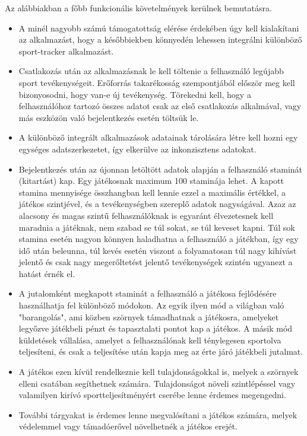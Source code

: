 Az alábbiakban a főbb funkcionális követelmények kerülnek bemutatásra. 

\begin{itemize}
	\item 
	A minél nagyobb számú támogatottság elérése érdekében úgy kell kialakítani az alkalmazást, hogy a későbbiekben könnyedén lehessen integrálni különböző sport-tracker alkalmazást. 
	\item 
	Csatlakozás után az alkalmazásnak le kell töltenie a felhasználó legújabb sport tevékenységeit. 
	Erőforrás takarékosság szempontjából először meg kell bizonyosodni, hogy van-e új tevékenység. 
	Törekedni kell, hogy a felhasználóhoz tartozó összes adatot csak az első csatlakozás alkalmával, vagy más eszközön való bejelentkezés esetén töltsük le. 
	\item
	A különböző integrált alkalmazások adatainak tárolására létre kell hozni egy egységes adatszerkezetet, így elkerülve az inkonzisztens adatokat. 
	\item 
	Bejelentkezés után az újonnan letöltött adatok alapján a felhasználó staminát (kitartást) kap. 
	Egy játékosnak maximum 100 staminája lehet. 
	A kapott stamina mennyisége összhangban kell lennie ezzel a maximális értékkel, a játékos szintjével, és a tevékenységben szereplő adatok nagyságával. 
	Azaz az alacsony és magas szintű felhasználóknak is egyaránt élvezetesnek kell maradnia a játéknak, nem szabad se túl sokat, se túl keveset kapni. 
	Túl sok stamina esetén nagyon könnyen haladhatna a felhasználó a játékban, így egy idő után beleunna, túl kevés esetén viszont a folyamatosan túl nagy kihívást jelentő és csak nagy megerőltetést jelentő tevékenységek szintén ugyanezt a hatást érnék el.
	\item 
	A jutalomként megkapott staminát a felhasználó a játékosa fejlődésére használhatja fel különböző módokon. 
	Az egyik ilyen mód a világban való "barangolás", ami közben szörnyek támadhatnak a játékosra, amelyeket legyőzve játékbeli pénzt és tapasztalati pontot kap a játékos. 
	A másik mód küldetések vállalása, amelyet a felhasználónak kell ténylegesen sportolva teljesíteni, és csak a teljesítése után kapja meg az érte járó játékbeli jutalmat.
	\item 
	A játékos ezen kívül rendelkeznie kell tulajdonságokkal is, melyek a szörnyek elleni csatában segíthetnek számára. 
	Tulajdonságot növeli szintlépéssel vagy valamilyen kirívó sportteljesítményért cserébe lenne érdemes megengedni.
	\item 
	További tárgyakat is érdemes lenne megvalósítani a játékos számára, melyek védelemmel vagy támadóerővel növelhetnék a játékos erejét.
\end{itemize}



